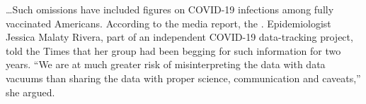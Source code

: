 \begin{refsection}
\begin{tcolorbox}[quote]
\end{tcolorbox}

\begin{tcolorbox}[quote]

\dots{}Such omissions have included figures on COVID-19 infections among fully vaccinated Americans. According to the media report, the  . Epidemiologist Jessica Malaty Rivera, part of an independent COVID-19 data-tracking project, told the Times that her group had been begging for such information for two years. \enquote{We are at much greater risk of misinterpreting the data with data vacuums than sharing the data with proper science, communication and caveats,} she argued.\textsuperscript{\cite{url923bnksd}}

\end{tcolorbox}

\printbibliography[heading=subbibliography]

\end{refsection}